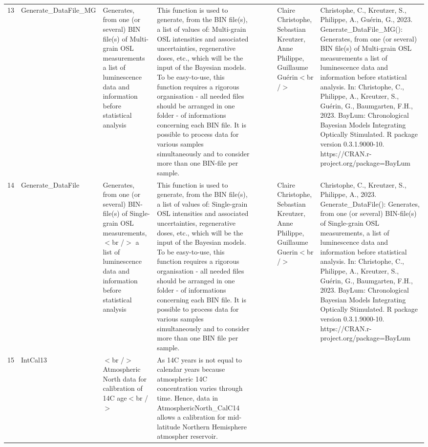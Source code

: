 \begin{table}[ht]
\begin{tabular}{rllllllll}
  13 & Generate\_DataFile\_MG & Generates, from one (or several) BIN file(s) of Multi-grain OSL measurements a list of luminescence data and information before statistical analysis & This function is used to generate, from the BIN file(s), a list of values of:  Multi-grain  OSL intensities and associated uncertainties, regenerative doses, etc., which will be the input of the Bayesian models. To be easy-to-use, this function requires a rigorous organisation - all needed files should be arranged in one folder - of informations concerning each BIN file.  It is possible to process data for various samples simultaneously and to consider more than one BIN-file per sample. &  &  &  & Claire Christophe, Sebastian Kreutzer, Anne Philippe, Guillaume Guérin$<$br /$>$ & Christophe, C., Kreutzer, S., Philippe, A., Guérin, G., 2023. Generate\_DataFile\_MG(): Generates, from one (or several) BIN file(s) of Multi-grain OSL measurements a list of luminescence data and information before statistical analysis. In: Christophe, C., Philippe, A., Kreutzer, S., Guérin, G., Baumgarten, F.H., 2023. BayLum: Chronological Bayesian Models Integrating Optically Stimulated. R package version 0.3.1.9000-10. https://CRAN.r-project.org/package=BayLum
 \\ 
  14 & Generate\_DataFile & Generates, from one (or several) BIN-file(s) of Single-grain OSL measurements,$<$br /$>$ a list of luminescence data and information before statistical analysis & This function is used to generate, from the BIN file(s), a list of values of: Single-grain  OSL intensities and associated uncertainties, regenerative doses, etc., which will be the input of the Bayesian models. To be easy-to-use, this function requires a rigorous organisation - all needed files should be arranged in one folder - of informations concerning each BIN file.   It is possible to process data for various samples simultaneously and to consider more than one BIN file per sample. &  &  &  & Claire Christophe, Sebastian Kreutzer, Anne Philippe, Guillaume Guerin$<$br /$>$ & Christophe, C., Kreutzer, S., Philippe, A., 2023. Generate\_DataFile(): Generates, from one (or several) BIN-file(s) of Single-grain OSL measurements, a list of luminescence data and information before statistical analysis. In: Christophe, C., Philippe, A., Kreutzer, S., Guérin, G., Baumgarten, F.H., 2023. BayLum: Chronological Bayesian Models Integrating Optically Stimulated. R package version 0.3.1.9000-10. https://CRAN.r-project.org/package=BayLum
 \\ 
  15 & IntCal13 & $<$br /$>$ Atmospheric North data for calibration of 14C age$<$br /$>$ & As 14C years is not equal to calendar years because atmospheric 14C concentration varies through time. Hence, data in AtmosphericNorth\_CalC14 allows a calibration for mid-latitude Northern Hemisphere atmospher reservoir. &  &  &  &  &  \\ 

\end{tabular}
\end{table}
